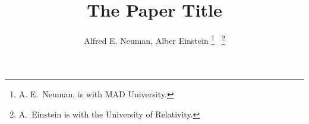 \documentclass[a4paper, 10pt, conference]{ieeeconf}
\title{\LARGE \bf
The Paper Title
}
\author{Alfred E. Neuman, Alber Einstein
\thanks{A. E.\ Neuman, is with MAD University.}
~\thanks{A.\ Einstein is with the University of Relativity.}
}
\begin{document}
\maketitle









\renewcommand*{\bibfont}{\small}
\printbibliography
\end{document}
